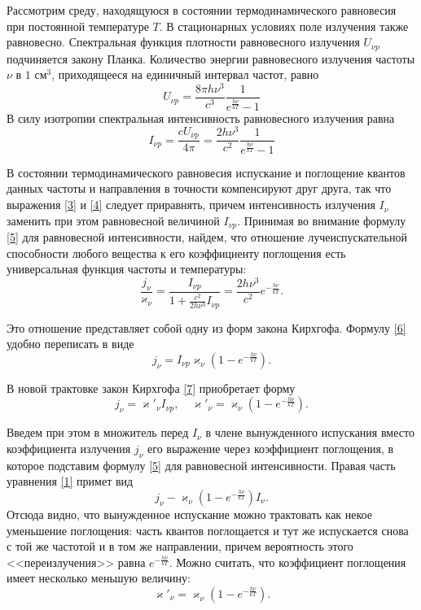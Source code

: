 Рассмотрим среду, находящуюся в состоянии термодинамического равновесия при постоянной температуре $T$. В стационарных условиях поле излучения также равновесно. Спектральная функция плотности равновесного излучения $U_{\nu p}$ подчиняется закону Планка. Количество энергии равновесного излучения частоты $\nu$ в $1 \text{ см}^3$, приходящееся на единичный интервал частот, равно
\begin {equation}
U_{\nu p} = \frac{8 \pi h \nu^3}{c^3} \frac {1}{e^{\frac{h\nu}{kT}} - 1}
\end {equation}
В силу изотропии спектральная интенсивность равновесного излучения равна
\begin {equation}
I_{\nu p} = \frac{cU_{\nu p}}{4\pi} = \frac{2h\nu^3}{c^2}\frac{1}{e^{\frac{h\nu}{kT}} - 1}
\label{5}
\end {equation}

В состоянии термодинамического равновесия испускание и поглощение квантов данных частоты и направления в точности компенсируют друг друга, так что выражения \eqref{3} и \eqref{4} следует приравнять, причем интенсивность излучения $I_{\nu}$ заменить при этом равновесной величиной $I_{\nu p}$. 
Принимая во внимание формулу \eqref{5} для равновесной интенсивности, найдем, что отношение лучеиспускательной способности любого вещества к его коэффициенту поглощения есть универсальная функция частоты и температуры:
\begin {equation}
\frac{j_{\nu}}{\varkappa_{\nu}} =  \frac{I_{\nu p}}{1+\frac{c^2}{2h\nu^3}I_{\nu p}} = \frac{2h\nu^3}{c^2}e^{-\frac{h\nu}{kT}}.
\label{6}
\end {equation}

Это отношение представляет собой одну из форм закона Кирхгофа. Формулу \eqref{6} удобно переписать в виде
\begin {equation}
j_{\nu} = I_{\nu p}\varkappa_{\nu}\left(1-e^{-\frac{h\nu}{kT}}\right).
\label{7}
\end {equation}

В новой трактовке закон Кирхгофа \eqref{7} приобретает форму
\begin {equation}
j_{\nu} = \varkappa'_{\nu}I_{\nu p}, \quad \varkappa'_{\nu} = \varkappa_{\nu}\left(1 - e^{-\frac{h\nu}{kT}}\right).
\end {equation}

Введем при этом в множитель перед $I_{\nu}$ в члене вынужденного испускания вместо коэффициента излучения $j_{\nu}$ его выражение через коэффициент поглощения, в которое подставим формулу \eqref{5} для равновесной интенсивности. Правая часть уравнения \eqref{1} примет вид 
\begin {equation}
j_{\nu} - \varkappa_{\nu}\left(1 - e^{-\frac{h\nu}{kT}}\right)I_{\nu}.
\end {equation}
Отсюда видно, что вынужденное испускание можно трактовать как некое уменьшение поглощения: часть квантов поглощается и тут же испускается снова с той же частотой и в том же направлении, причем вероятность этого <<переизлучения>> равна $e^{-\frac{h\nu}{kT}}$. Можно считать, что коэффициент поглощения имеет несколько меньшую величину:
\begin {equation}
\varkappa'_{\nu} = \varkappa_{\nu}\left(1 - e^{-\frac{h\nu}{kT}}\right).
\end {equation}

